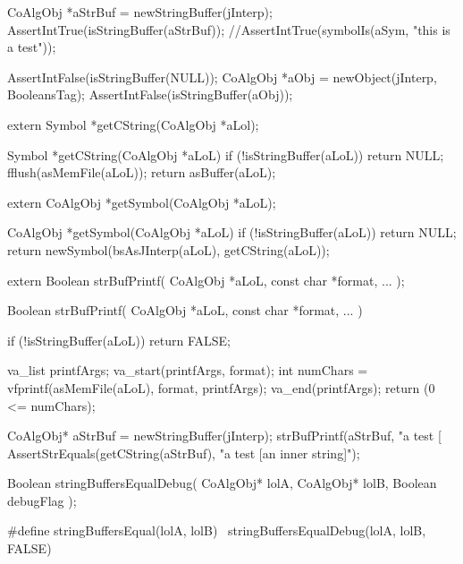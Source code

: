 
\startCTest
  CoAlgObj *aStrBuf = newStringBuffer(jInterp);
  AssertIntTrue(isStringBuffer(aStrBuf));
  //AssertIntTrue(symbolIs(aSym, "this is a test"));
\stopCTest
\stopTestCase

\startCTest
  AssertIntFalse(isStringBuffer(NULL));
  CoAlgObj *aObj = newObject(jInterp, BooleansTag);
  AssertIntFalse(isStringBuffer(aObj));
\stopCTest
\stopTestCase
\stopTestSuite


\startCHeader
extern Symbol *getCString(CoAlgObj *aLol);
\stopCHeader

\startCCode
Symbol *getCString(CoAlgObj *aLoL) {
  if (!isStringBuffer(aLoL)) return NULL;
  fflush(asMemFile(aLoL));
  return asBuffer(aLoL);
}
\stopCCode

\startCHeader
extern CoAlgObj *getSymbol(CoAlgObj *aLoL);
\stopCHeader

\startCCode
CoAlgObj *getSymbol(CoAlgObj *aLoL) {
  if (!isStringBuffer(aLoL)) return NULL;
  return newSymbol(bsAsJInterp(aLoL), getCString(aLoL));
}
\stopCCode

\stopTestSuite

\startTestSuite[strBufPrintf]

\startCHeader
extern Boolean strBufPrintf(
  CoAlgObj   *aLoL,
  const char *format, 
  ...
);
\stopCHeader

\startCCode
Boolean strBufPrintf(
  CoAlgObj   *aLoL,
  const char *format,
  ...
) {
  if (!isStringBuffer(aLoL)) return FALSE;
  
  va_list printfArgs;
  va_start(printfArgs, format);
  int numChars = vfprintf(asMemFile(aLoL), format, printfArgs);
  va_end(printfArgs);
  return (0 <= numChars);
}
\stopCCode

\startCTest
  CoAlgObj* aStrBuf = newStringBuffer(jInterp);
  strBufPrintf(aStrBuf, "a test [%
  AssertStrEquals(getCString(aStrBuf), "a test [an inner string]");
\stopCTest
\stopTestCase
\stopTestSuite


\startCHeader
Boolean stringBuffersEqualDebug(
  CoAlgObj* lolA,
  CoAlgObj* lolB,
  Boolean debugFlag
);

#define stringBuffersEqual(lolA, lolB) \
  stringBuffersEqualDebug(lolA, lolB, FALSE)
\stopCHeader

